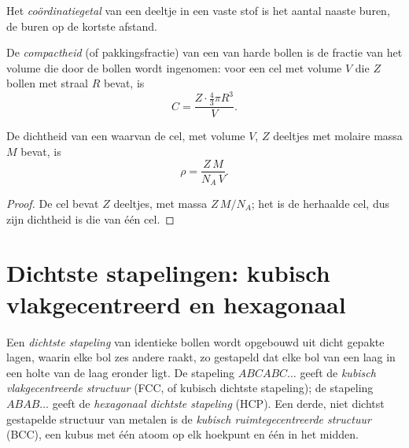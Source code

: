 \begin{definition}[Coördinatiegetal]\label{def:b1:crystals-metals:coordination}
Het \emph{coördinatiegetal} van
een deeltje in een vaste stof is het aantal naaste buren, de buren op de
kortste afstand.
\end{definition}

\begin{definition}[Compactheid]\label{def:b1:crystals-metals:compactness}
De \emph{compactheid} (of pakkingsfractie) van een
 van harde bollen is de fractie van het volume die door de bollen
wordt ingenomen: voor een cel met volume $V$ die $Z$ bollen met straal
$R$ bevat, is
\[
  C = \frac{Z \cdot \frac43 \pi R^3}{V} .
\]
\end{definition}


\begin{proposition}\label{prop:b1:crystals-metals:density}
De dichtheid van een  waarvan de cel, met volume $V$, $Z$ deeltjes
met molaire massa $M$ bevat, is
\[
  \rho = \frac{Z\,M}{N_A\,V} .
\]
\end{proposition}


\begin{proof}
De cel bevat $Z$ deeltjes, met massa $Z\,M/N_A$; het  is de
herhaalde cel, dus zijn dichtheid is die van één cel.
\end{proof}

\section{Dichtste stapelingen: kubisch vlakgecentreerd en hexagonaal}

\begin{definition}\label{def:b1:crystals-metals:packings}
Een \emph{dichtste stapeling} van identieke
bollen wordt opgebouwd uit dicht gepakte lagen, waarin elke bol zes
andere raakt, zo gestapeld dat elke bol van een laag in een holte van de
laag eronder ligt. De stapeling $ABCABC\dots$ geeft de \emph{kubisch
vlakgecentreerde structuur}
(FCC, of kubisch dichtste stapeling); de stapeling $ABAB\dots$ geeft de
\emph{hexagonaal dichtste stapeling}
(HCP). Een derde, niet dichtst gestapelde structuur van metalen is de
\emph{kubisch ruimtegecentreerde structuur}
(BCC), een kubus met één atoom op elk hoekpunt en één in het midden.
\end{definition}

